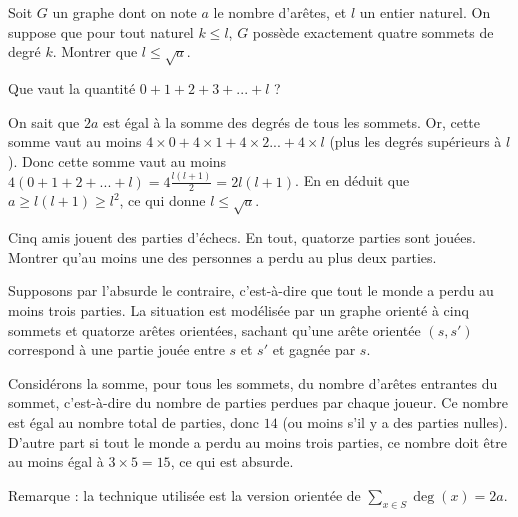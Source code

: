 \begin{exo}
Soit $G$ un graphe dont on note $a$ le nombre d'arêtes, et $l$ un entier naturel. On suppose que pour tout naturel $k\leq l$, $G$ possède exactement quatre sommets de degré $k$. Montrer que $l\leq \sqrt a$.
\begin{hint}
Que vaut la quantité $0+1+2+3+...+l$ ?
\end{hint}
\begin{sol}
On sait que $2a$ est égal à la somme des degrés de tous les sommets. Or, cette somme vaut au moins $4\times0+4\times 1+4\times 2 ... + 4\times l$ (plus les degrés supérieurs à $l$). Donc cette somme vaut au moins $4(0+1+2+...+l) = 4\frac{l(l+1)}{2} = 2l(l+1)$. En en déduit que $a \geq l(l+1) \geq l^2$, ce qui donne $l\leq \sqrt a$.
\end{sol}
\end{exo}

\begin{exo}
Cinq amis jouent des parties d'échecs. En tout, quatorze parties sont jouées. Montrer qu'au moins une des personnes a perdu au plus deux parties.
\begin{sol}
Supposons par l'absurde le contraire, c'est-à-dire que tout le monde a perdu au moins trois parties. La situation est modélisée par un graphe orienté à cinq sommets et quatorze arêtes orientées, sachant qu'une arête orientée $(s,s')$ correspond à une partie jouée entre $s$ et $s'$ et gagnée par $s$.

Considérons la somme, pour tous les sommets, du nombre d'arêtes entrantes du sommet, c'est-à-dire du nombre de parties perdues par chaque joueur. Ce nombre est égal au nombre total de parties, donc $14$ (ou moins s'il y a des parties nulles). D'autre part si tout le monde a perdu au moins trois parties, ce nombre doit être au moins égal à $3\times 5=15$, ce qui est absurde.

Remarque : la technique utilisée est la version orientée de $\sum_{x\in S}\operatorname{deg}(x) = 2a$.
\end{sol}
\end{exo}

